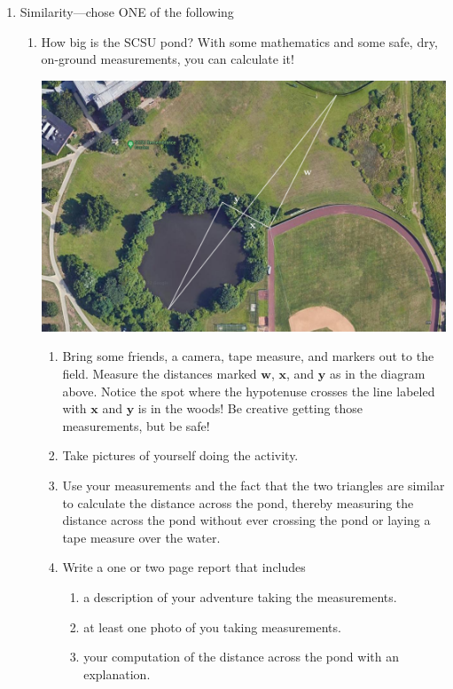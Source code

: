 \begin{enumerate}
\item Similarity---chose ONE of the following
\begin{enumerate}
\item How big is the SCSU pond? With some mathematics and some safe, dry, on-ground measurements, you can calculate it! 
\begin{center}
    \includegraphics[width=5.5in]{images/SCSU Pond}
\end{center}
\begin{enumerate}
\item Bring some friends, a camera, tape measure, and markers out to the field. Measure the distances marked $\mathbf w$, $\mathbf x$, and $\mathbf y$ as in the diagram above. Notice the spot where the hypotenuse crosses the line labeled with $\mathbf x$ and $\mathbf y$ is in the woods! Be creative getting those measurements, but be safe!
\item Take pictures of yourself doing the activity.
\item Use your measurements and the fact that the two triangles are similar to calculate the distance across the pond, thereby measuring the distance across the pond without ever crossing the pond or laying a tape measure over the water.
\item Write a one or two page report that includes
\begin{enumerate}
    \item a description of your adventure taking the measurements.
    \item at least one photo of you taking measurements.
    \item your computation of the distance across the pond with an explanation.
\end{enumerate}


\end{enumerate}
\end{enumerate}
\end{enumerate}
